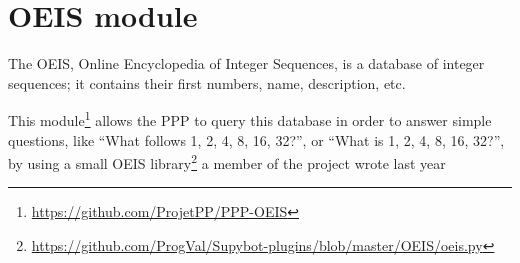 \section{OEIS module}

The OEIS, Online Encyclopedia of Integer Sequences, is a database of integer
sequences; it contains their first numbers, name, description, etc.

This module\footnote{\url{https://github.com/ProjetPP/PPP-OEIS}} allows the
PPP to query this database in order to answer simple questions, like
“What follows 1, 2, 4, 8, 16, 32?”, or “What is 1, 2, 4, 8, 16, 32?”,
by using a small OEIS library\footnote{\url{https://github.com/ProgVal/Supybot-plugins/blob/master/OEIS/oeis.py}}
a member of the project wrote last year
